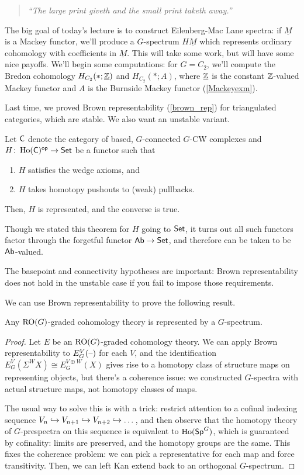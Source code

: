 \begin{quote}\textit{
	``The large print giveth and the small print taketh away.''
}\end{quote}
The big goal of today's lecture is to construct Eilenberg-Mac Lane spectra: if $\underline M$ is a Mackey functor,
we'll produce a $G$-spectrum $H\underline M$ which represents ordinary cohomology with coefficients in $\underline
M$. This will take some work, but will have some nice payoffs. We'll begin some computations: for $G = C_2$, we'll
compute the Bredon cohomology $H_{C_2}(*;\underline{\mathbb Z})$ and $H_{C_2}(*;A)$, where $\underline{\mathbb Z}$ is the
constant $\mathbb Z$-valued Mackey functor and $A$ is the Burnside Mackey functor (\cref{Mackeyexm}).

Last time, we proved Brown representability (\cref{brown_rep}) for triangulated categories, which are stable. We
also want an unstable variant.
\begin{thm}
Let $\mathsf C$ denote the category of based, $G$-connected $G$-CW complexes and $H\colon \operatorname{Ho}(\mathsf C)^{\mathsf{op}}\to\mathsf{Set}$ be a
functor such that
\begin{enumerate}
	\item $H$ satisfies the wedge axioms, and
	\item $H$ takes homotopy pushouts to (weak) pullbacks.
\end{enumerate}
Then, $H$ is represented, and the converse is true.
\end{thm}
Though we stated this theorem for $H$ going to $\mathsf{Set}$, it turns out all such functors factor through the forgetful
functor $\mathsf{Ab}\to\mathsf{Set}$, and therefore can be taken to be $\mathsf{Ab}$-valued.
\begin{warn}
The basepoint and connectivity hypotheses are important: Brown representability does not hold in the unstable case
if you fail to impose those requirements.
\end{warn}
We can use Brown representability to prove the following result.
\begin{prop}
Any $\mathrm{RO}(G)$-graded cohomology theory is represented by a $G$-spectrum.
\end{prop}
\begin{proof}
Let $E$ be an $\mathrm{RO}(G)$-graded cohomology theory. We can apply Brown representability to $E_G^V(\text{--})$ for each $V$,
and the identification $E_G^V(\Sigma^W X)\cong E_G^{V\oplus W}(X)$ gives rise to a homotopy class of structure maps
on representing objects, but there's a coherence issue: we constructed $G$-spectra with actual structure maps, not
homotopy classes of maps.

The usual way to solve this is with a trick: restrict attention to a cofinal indexing sequence $V_n\hookrightarrow V_{n+1}\hookrightarrow
V_{n+2}\hookrightarrow\dots$, and then observe that the homotopy theory of $G$-prespectra on this sequence is equivalent to
$\operatorname{Ho}(\mathsf{Sp}^G)$, which is guaranteed by cofinality: limits are preserved, and the homotopy groups are the same. This
fixes the coherence problem: we can pick a representative for each map and force transitivity. Then, we can left
Kan extend back to an orthogonal $G$-spectrum.
\end{proof}
